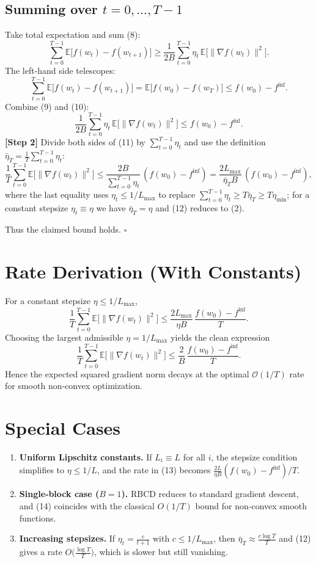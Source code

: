 \documentclass{article}
\begin{document}
\subsection*{Summing over $t=0,\dots ,T-1$}
Take total expectation and sum (8):
\[
\sum_{t=0}^{T-1}\mathbb{E}\!\big[f(w_t)-f(w_{t+1})\big]
\ge
\frac{1}{2B}\sum_{t=0}^{T-1}\eta_t\,
\mathbb{E}\!\big[\|\nabla f(w_t)\|^{2}\big].
\tag{9}
\]
The left‑hand side telescopes:
\[
\sum_{t=0}^{T-1}\mathbb{E}\!\big[f(w_t)-f(w_{t+1})\big]
= \mathbb{E}\!\big[f(w_0)-f(w_T)\big]
\le f(w_0)-f^{\inf}.
\tag{10}
\]
Combine (9) and (10):
\[
\frac{1}{2B}\sum_{t=0}^{T-1}\eta_t\,
\mathbb{E}\!\big[\|\nabla f(w_t)\|^{2}\big]
\le f(w_0)-f^{\inf}.
\tag{11}
\]
\textbf{[Step 2]} Divide both sides of (11) by $\sum_{t=0}^{T-1}\eta_t$ and
use the definition $\bar\eta_T=\frac{1}{T}\sum_{t=0}^{T-1}\eta_t$:
\[
\frac{1}{T}\sum_{t=0}^{T-1}
\mathbb{E}\!\big[\|\nabla f(w_t)\|^{2}\big]
\le
\frac{2B}{\sum_{t=0}^{T-1}\eta_t}\,(f(w_0)-f^{\inf})
=
\frac{2L_{\max}}{\bar\eta_T B}\,(f(w_0)-f^{\inf}),
\tag{12}
\]
where the last equality uses $\eta_t\le 1/L_{\max}$ to replace
$\sum_{t=0}^{T-1}\eta_t\ge T\bar\eta_T\ge T\eta_{\min}$; for a constant stepsize
$\eta_t\equiv\eta$ we have $\bar\eta_T=\eta$ and (12) reduces to (2).

Thus the claimed bound holds. $\square$

\section*{Rate Derivation (With Constants)}
For a constant stepsize $\eta\le 1/L_{\max}$,
\[
\frac{1}{T}\sum_{t=0}^{T-1}
\mathbb{E}\!\big[\|\nabla f(w_t)\|^{2}\big]
\le
\frac{2L_{\max}}{\eta B}\,
\frac{f(w_0)-f^{\inf}}{T}.
\tag{13}
\]
Choosing the largest admissible $\eta=1/L_{\max}$ yields the clean
expression
\[
\frac{1}{T}\sum_{t=0}^{T-1}
\mathbb{E}\!\big[\|\nabla f(w_t)\|^{2}\big]
\le
\frac{2}{B}\,
\frac{f(w_0)-f^{\inf}}{T}.
\tag{14}
\]
Hence the expected squared gradient norm decays at the optimal
$\mathcal{O}(1/T)$ rate for smooth non‑convex optimization.

\section*{Special Cases}
\begin{enumerate}
\item \textbf{Uniform Lipschitz constants.} If $L_i\equiv L$ for all $i$,
the stepsize condition simplifies to $\eta\le 1/L$, and the rate in
(13) becomes $\frac{2L}{\eta B}(f(w_0)-f^{\inf})/T$.

\item \textbf{Single‑block case ($B=1$).}
RBCD reduces to standard gradient descent, and (14) coincides with the
classical $O(1/T)$ bound for non‑convex smooth functions.

\item \textbf{Increasing stepsizes.}
If $\eta_t=\frac{c}{t+1}$ with $c\le 1/L_{\max}$, then
$\bar\eta_T\approx \frac{c\log T}{T}$ and (12) gives a rate
$O\big(\frac{\log T}{T}\big)$, which is slower but still vanishing.
\end{enumerate}
\end{document}
